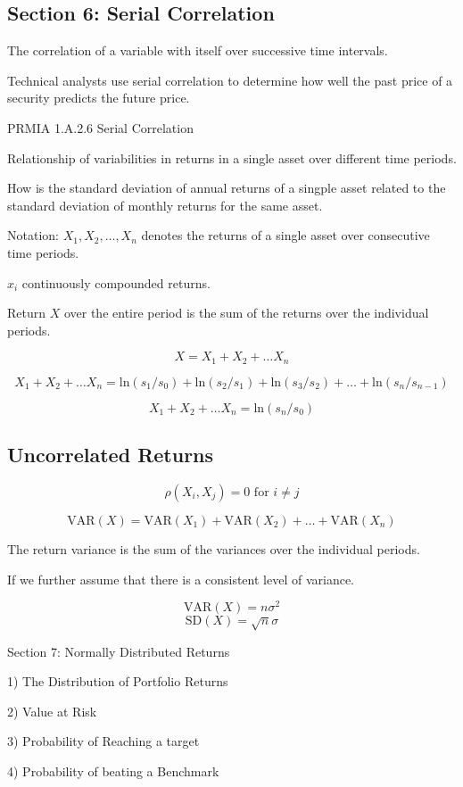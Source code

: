 \subsection*{Section 6: Serial Correlation}


The correlation of a variable with itself over successive time intervals. 

Technical analysts use serial correlation to determine how well the past price of a security predicts the future price.


PRMIA 1.A.2.6 Serial Correlation

Relationship of variabilities in returns in a single asset over different time periods.

How is the standard deviation of annual returns of a singple asset related to the standard deviation of monthly returns for the same asset.

Notation: $ X_1 , X_2 , \ldots , X_n $ denotes the returns of a single asset over consecutive time periods.


$x_i$ continuously compounded returns.

Return $X$ over the entire period is the sum of the returns over the individual periods.

\[ X = X_1 + X_2 + \ldots X_n \]

\[ X_1 + X_2 + \ldots X_n = \mathrm{ln}(s_1/s_0) + \mathrm{ln}(s_2/s_1) + \mathrm{ln}(s_3/s_2) + \ldots + \mathrm{ln}(s_n/s_{n-1})\]

\[ X_1 + X_2 + \ldots X_n = \mathrm{ln}(s_n/s_0) \]
\subsection*{Uncorrelated Returns}
\[ \rho(X_i,X_j) = 0 \mbox{ for } i \neq j \]

\[ \mathrm{VAR}(X) = \mathrm{VAR}(X_1) + \mathrm{VAR}(X_2) + \ldots + \mathrm{VAR}(X_n) \]


The return variance is the sum of the variances over the individual periods.


If we further assume that there is a consistent level of variance.

\[ \mathrm{VAR}(X) = n \sigma^2 \]
\[ \mathrm{SD}(X) = \sqrt{n} \sigma \]



Section 7: Normally Distributed Returns

1) The Distribution of Portfolio Returns

2) Value at Risk

3) Probability of Reaching a target

4) Probability of beating a Benchmark


